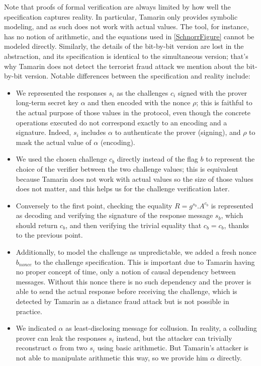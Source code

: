 Note that proofs of formal verification are always limited by how well the specification captures reality.
In particular, Tamarin only provides symbolic modeling, and as such does not work with actual values. The tool, for instance, has no notion of arithmetic, and the equations used in \cref{SchnorrFigure} cannot be modeled directly. Similarly, the details of the bit-by-bit version are lost in the abstraction, and its specification is identical to the simultaneous version; that's why Tamarin does not detect the terrorist fraud attack we mention about the bit-by-bit version.
Notable differences between the specification and reality include:
\begin{itemize}
	\item We represented the responses $s_i$ as the challenges $c_i$ signed with the prover long-term secret key $\alpha$ and then encoded with the nonce $\rho$; this is faithful to the actual purpose of those values in the protocol, even though the concrete operations executed do not correspond exactly to an encoding and a signature. Indeed, $s_i$ includes $\alpha$ to authenticate the prover (signing), and $\rho$ to mask the actual value of $\alpha$ (encoding).
	\item We used the chosen challenge $c_b$ directly instead of the flag $b$ to represent the choice of the verifier between the two challenge values; this is equivalent because Tamarin does not work with actual values so the size of those values does not matter, and this helps us for the challenge verification later.
	\item Conversely to the first point, checking the equality $R = g^{s_b}.A^{c_b}$ is represented as decoding and verifying the signature of the response message $s_b$, which should return $c_b$, and then verifying the trivial equality that $c_b = c_b$, thanks to the previous point.
	\item Additionally, to model the challenge as unpredictable, we added a fresh nonce $b_{nonce}$ to the challenge specification. This is important due to Tamarin having no proper concept of time, only a notion of causal dependency between messages. Without this nonce there is no such dependency and the prover is able to send the actual response before receiving the challenge, which is detected by Tamarin as a distance fraud attack but is not possible in practice.
	\item We indicated $\alpha$ as least-disclosing message for collusion. In reality, a colluding prover can leak the responses $s_i$ instead, but the attacker can trivially reconstruct $\alpha$ from two $s_i$ using basic arithmetic. But Tamarin's attacker is not able to manipulate arithmetic this way, so we provide him $\alpha$ directly.

\end{itemize}
